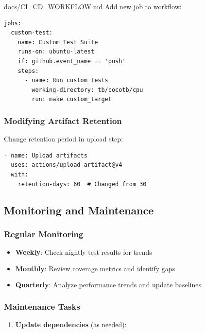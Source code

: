 \begin{relocated}{docs/CI_CD_WORKFLOW.md}
Add new job to workflow:

\begin{lstlisting}[language={}]
jobs:
  custom-test:
    name: Custom Test Suite
    runs-on: ubuntu-latest
    if: github.event_name == 'push'
    steps:
      - name: Run custom tests
        working-directory: tb/cocotb/cpu
        run: make custom_target
\end{lstlisting}

\subsubsection{Modifying Artifact Retention}\label{um:flow:ci-cd-workflow:modifying-artifact-retention}

Change retention period in upload step:

\begin{lstlisting}[language={}]
- name: Upload artifacts
  uses: actions/upload-artifact@v4
  with:
    retention-days: 60  # Changed from 30
\end{lstlisting}

\subsection{Monitoring and Maintenance}\label{um:flow:ci-cd-workflow:monitoring-and-maintenance}

\subsubsection{Regular Monitoring}\label{um:flow:ci-cd-workflow:regular-monitoring}

\begin{itemize}
\tightlist
\item
  \textbf{Weekly}: Check nightly test results for trends
\item
  \textbf{Monthly}: Review coverage metrics and identify gaps
\item
  \textbf{Quarterly}: Analyze performance trends and update baselines
\end{itemize}

\subsubsection{Maintenance Tasks}\label{um:flow:ci-cd-workflow:maintenance-tasks}

\begin{enumerate}
\def\labelenumi{\arabic{enumi}.}
\item
  \textbf{Update dependencies} (as needed):


\end{enumerate}
\end{relocated}
